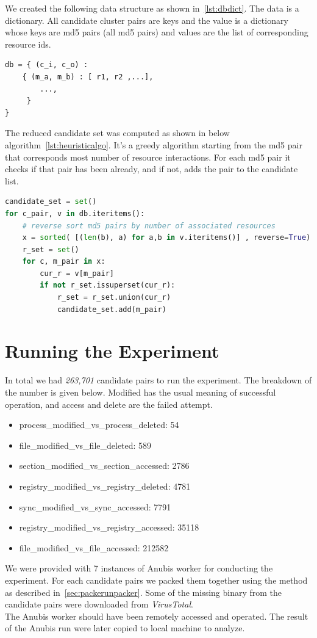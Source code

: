 We created the following data structure as shown in~\ref{lst:dbdict}.
The data is a dictionary. All candidate cluster pairs are keys and the value is a dictionary whose keys are md5 pairs (all md5 pairs) and values are the list of corresponding resource ids.
\begin{lstlisting}[language=python,floatplacement=H,caption={Database Structure},label={lst:dbdict}]
db = { (c_i, c_o) :
    { (m_a, m_b) : [ r1, r2 ,...],
        ...,
     }
}
\end{lstlisting}
The reduced candidate set was computed as shown in below algorithm~\ref{lst:heuristicalgo}.
It's a greedy algorithm starting from the md5 pair that corresponds most number of resource interactions.
For each md5 pair it checks if that pair has been already, and if not, adds the pair to the candidate list.
\begin{lstlisting}[float,floatplacement=htbp,language=python,caption={Alogrithm to get minimal set of candidates for all resource},label={lst:heuristicalgo}]
candidate_set = set()
for c_pair, v in db.iteritems():
    # reverse sort md5 pairs by number of associated resources
    x = sorted( [(len(b), a) for a,b in v.iteritems()] , reverse=True)
    r_set = set()
    for c, m_pair in x:
        cur_r = v[m_pair]
        if not r_set.issuperset(cur_r):
            r_set = r_set.union(cur_r)
            candidate_set.add(m_pair)
\end{lstlisting}
\section{Running the Experiment}
\label{sec:Running the Experiment}
In total we had \emph{263,701} candidate pairs to run the experiment.
The breakdown of the number is given below.
Modified has the usual meaning of successful operation, and access and delete are the failed attempt.
\begin{itemize}
  \item process\_modified\_vs\_process\_deleted: 54
  \item file\_modified\_vs\_file\_deleted: 589
  \item section\_modified\_vs\_section\_accessed: 2786
  \item registry\_modified\_vs\_registry\_deleted: 4781
  \item sync\_modified\_vs\_sync\_accessed: 7791
  \item registry\_modified\_vs\_registry\_accessed: 35118
  \item file\_modified\_vs\_file\_accessed: 212582
\end{itemize}
We were provided with 7 instances of Anubis worker for conducting the experiment.
For each candidate pairs we packed them together using the method as described in~\ref{sec:packerunpacker}.
Some of the missing binary from the candidate pairs were downloaded from \emph{VirusTotal}.\\
The Anubis worker should have been remotely accessed and operated. The result of the Anubis run were later copied to local machine to analyze.
